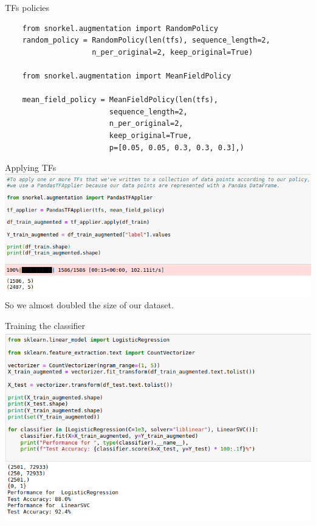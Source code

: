 \documentclass{beamer}
\begin{document}
\begin{frame}[fragile]{TFs policies}
    \small
    \begin{verbatim}
    from snorkel.augmentation import RandomPolicy
    random_policy = RandomPolicy(len(tfs), sequence_length=2, 
                    n_per_original=2, keep_original=True)

    from snorkel.augmentation import MeanFieldPolicy

    mean_field_policy = MeanFieldPolicy(len(tfs),
                        sequence_length=2,
                        n_per_original=2,
                        keep_original=True,
                        p=[0.05, 0.05, 0.3, 0.3, 0.3],)
    \end{verbatim}
\end{frame}

\begin{frame}{Applying TFs}
         \includegraphics[width=\textwidth]{figures/applyingtfs.png}
         So we almost doubled the size of our dataset.
\end{frame}

\begin{frame}{Training the classifier}
             \includegraphics[width=\textwidth]{figures/tfsclassifier.png}
\end{frame}
\end{document}
